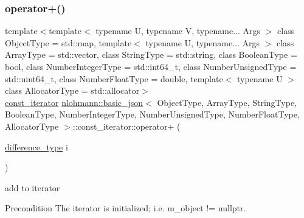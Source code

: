\subsubsection{\texorpdfstring{operator+()}{operator+()}}
{\footnotesize\ttfamily template$<$template$<$ typename U, typename V, typename... Args $>$ class Object\+Type = std\+::map, template$<$ typename U, typename... Args $>$ class Array\+Type = std\+::vector, class String\+Type  = std\+::string, class Boolean\+Type  = bool, class Number\+Integer\+Type  = std\+::int64\+\_\+t, class Number\+Unsigned\+Type  = std\+::uint64\+\_\+t, class Number\+Float\+Type  = double, template$<$ typename U $>$ class Allocator\+Type = std\+::allocator$>$ \\
\hyperlink{classnlohmann_1_1basic__json_1_1const__iterator}{const\+\_\+iterator} \hyperlink{classnlohmann_1_1basic__json}{nlohmann\+::basic\+\_\+json}$<$ Object\+Type, Array\+Type, String\+Type, Boolean\+Type, Number\+Integer\+Type, Number\+Unsigned\+Type, Number\+Float\+Type, Allocator\+Type $>$\+::const\+\_\+iterator\+::operator+ (\begin{DoxyParamCaption}\item[{\hyperlink{classnlohmann_1_1basic__json_1_1const__iterator_a49d7c3e9ef3280df03052cce988b792f}{difference\+\_\+type}}]{i }\end{DoxyParamCaption})\hspace{0.3cm}{\ttfamily [inline]}}



add to iterator 

\begin{DoxyPrecond}{Precondition}
The iterator is initialized; i.\+e. {\ttfamily m\+\_\+object != nullptr}. 
\end{DoxyPrecond}
\hypertarget{classnlohmann_1_1basic__json_1_1const__iterator_a8dbaec5bf8ccba3225520356629061cb}{}\label{classnlohmann_1_1basic__json_1_1const__iterator_a8dbaec5bf8ccba3225520356629061cb} 
